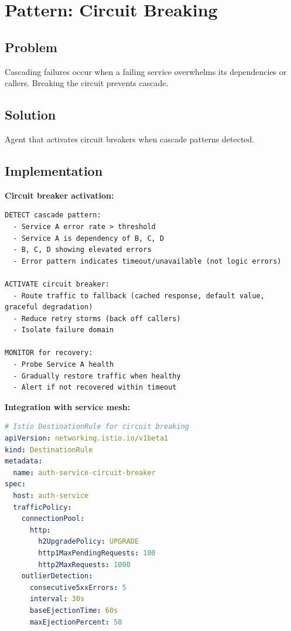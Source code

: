\section{Pattern: Circuit Breaking}
\label{sec:circuit-breaking}

\subsection{Problem}

Cascading failures occur when a failing service overwhelms its dependencies or callers. Breaking the circuit prevents cascade.

\subsection{Solution}

Agent that activates circuit breakers when cascade patterns detected.

\subsection{Implementation}

\textbf{Circuit breaker activation:}

\begin{lstlisting}[caption={Circuit Breaker Activation Logic}]
DETECT cascade pattern:
  - Service A error rate > threshold
  - Service A is dependency of B, C, D
  - B, C, D showing elevated errors
  - Error pattern indicates timeout/unavailable (not logic errors)

ACTIVATE circuit breaker:
  - Route traffic to fallback (cached response, default value, graceful degradation)
  - Reduce retry storms (back off callers)
  - Isolate failure domain

MONITOR for recovery:
  - Probe Service A health
  - Gradually restore traffic when healthy
  - Alert if not recovered within timeout
\end{lstlisting}

\textbf{Integration with service mesh:}

\begin{lstlisting}[language=yaml,caption={Istio Circuit Breaker Configuration}]
# Istio DestinationRule for circuit breaking
apiVersion: networking.istio.io/v1beta1
kind: DestinationRule
metadata:
  name: auth-service-circuit-breaker
spec:
  host: auth-service
  trafficPolicy:
    connectionPool:
      http:
        h2UpgradePolicy: UPGRADE
        http1MaxPendingRequests: 100
        http2MaxRequests: 1000
    outlierDetection:
      consecutive5xxErrors: 5
      interval: 30s
      baseEjectionTime: 60s
      maxEjectionPercent: 50
\end{lstlisting}

